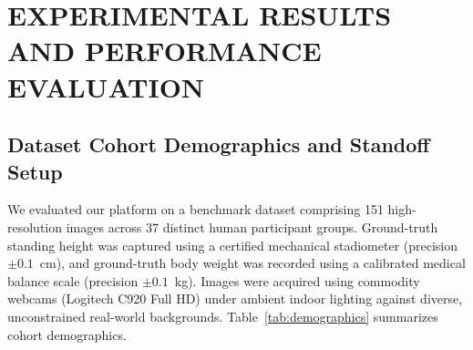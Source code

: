 \documentclass[12pt,a4paper,oneside]{report}
\begin{document}
\chapter{EXPERIMENTAL RESULTS AND PERFORMANCE EVALUATION}

\section{Dataset Cohort Demographics and Standoff Setup}
We evaluated our platform on a benchmark dataset comprising 151 high-resolution images across 37 distinct human participant groups. Ground-truth standing height was captured using a certified mechanical stadiometer (precision $\pm 0.1$~cm), and ground-truth body weight was recorded using a calibrated medical balance scale (precision $\pm 0.1$~kg). Images were acquired using commodity webcams (Logitech C920 Full HD) under ambient indoor lighting against diverse, unconstrained real-world backgrounds. Table~\ref{tab:demographics} summarizes cohort demographics.

\begin{table}[H]
\centering
\caption{Cohort Demographic Summary Across 37 Participant Groups ($N=151$ Images)}
\label{tab:demographics}
\end{table}
\end{document}
